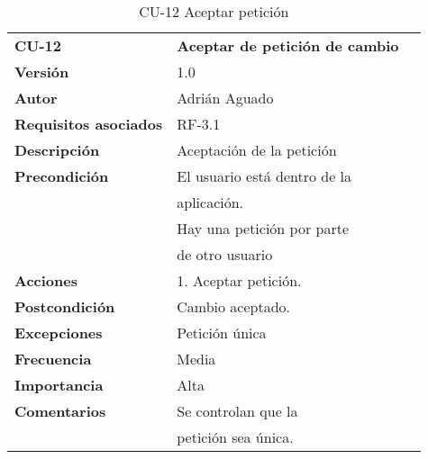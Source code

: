 \begin{table}
\begin{tabular}{llr}  
\toprule
\begin{minipage}[b]{0.24\columnwidth}\raggedright\strut
\textbf{CU-12}\strut
\end{minipage} & \begin{minipage}[b]{0.72\columnwidth}\raggedright\strut
\textbf{Aceptar de petición de cambio}\strut
\end{minipage}\tabularnewline
\cmidrule(r){1-2}
\textbf{Versión}       & 1.0           \\
\textbf{Autor}       & Adrián  Aguado    \\
\textbf{Requisitos asociados}       & RF-3.1 \\
\textbf{Descripción} & Aceptación de la petición\\
\textbf{Precondición}  & El usuario está dentro de la \\
& aplicación.      \\
& Hay una petición por parte \\
& de otro usuario \\
\textbf{Acciones} & 1. Aceptar petición. \\
\textbf{Postcondición} & Cambio aceptado. \\
\textbf{Excepciones} &   Petición única  \\
\textbf{Frecuencia} & Media          \\
\textbf{Importancia} & Alta            \\
\textbf{Comentarios } & Se controlan que la       \\
& petición sea única. \\
\bottomrule
\end{tabular}
\caption{CU-12 Aceptar petición} 
\end{table}

